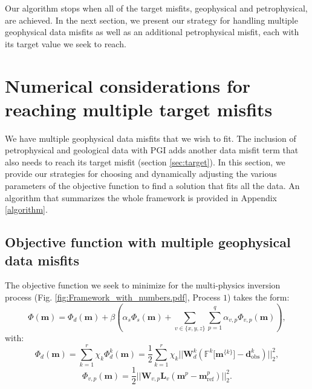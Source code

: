\documentclass[extra, mreferee]{gji_joint} %
\begin{document}
Our algorithm stops when all of the target misfits, geophysical and petrophysical, are achieved. In the next section, we present our strategy for handling multiple geophysical data misfits as well as an additional petrophysical misfit, each with its target value we seek to reach.

\section{Numerical considerations for reaching multiple target misfits}\label{section:Implementation}

We have multiple geophysical data misfits that we wish to fit. The inclusion of petrophysical and geological data with PGI adds another data misfit term that also needs to reach its target misfit (section \ref{sec:target}). In this section, we provide our strategies for choosing and dynamically adjusting the various parameters of the objective function to find a solution that fits all the data. An algorithm that summarizes the whole framework is provided in Appendix \ref{algorithm}.

\subsection{Objective function with multiple geophysical data misfits}

The objective function we seek to minimize for the multi-physics inversion process (Fig. \ref{fig:Framework_with_numbers.pdf}, Process $1$) takes the form:
\begin{equation}
\Phi(\mathbf{m}) = \Phi_d(\mathbf{m}) + \beta \left( \alpha_s \Phi_s(\mathbf{m}) + \sum_{v\in{\{x, y, z\}}}\sum_{p=1}^q\alpha_{v, p}{\Phi_{v, p}(\mathbf{m})}\right) \label{fullobjfct},
\end{equation}
with:
\begin{equation}
\Phi_d(\mathbf{m}) = \sum_{k=1}^r \chi_k \Phi_d^k(\mathbf{m}) = \frac{1}{2} \sum_{k=1}^r \chi_k ||\mathbf{W}_{d}^k(\mathbb{F}^k\lbrack\mathbf{m}^{\{k\}}\rbrack-\mathbf{d}_{\text{obs}}^k)||^2_2, \label{eq:datamisfit}
\end{equation}
\begin{equation}
\Phi_{v, p}(\mathbf{m}) = \frac{1}{2}||\mathbf{W}_{v,p}\mathbf{L}_v(\mathbf{m}^p-\mathbf{m}^p_{\text{ref}})||_2^2 \label{eq:smoothnessip}.
\end{equation}
\end{document}
